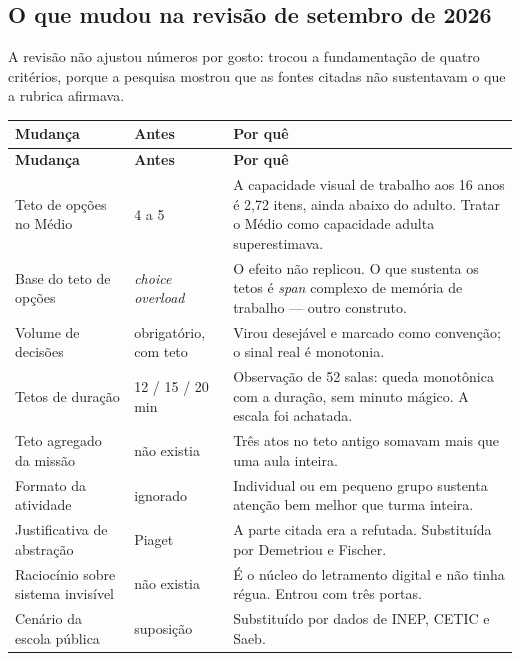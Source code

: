 \documentclass[11pt,a4paper]{article}
\begin{document}
\subsection{O que mudou na revisão de setembro de 2026}

A revisão não ajustou números por gosto: trocou a fundamentação de quatro critérios, porque a pesquisa mostrou que as fontes citadas não sustentavam o que a rubrica afirmava.

\begin{center}
\begin{longtable}{p{3.9cm}p{3.0cm}p{8.0cm}}
\toprule
\sffamily\bfseries\footnotesize\color{unNavy}Mudança & \sffamily\bfseries\footnotesize\color{unNavy}Antes & \sffamily\bfseries\footnotesize\color{unNavy}Por quê \\
\midrule
\endfirsthead
\toprule
\sffamily\bfseries\footnotesize\color{unNavy}Mudança & \sffamily\bfseries\footnotesize\color{unNavy}Antes & \sffamily\bfseries\footnotesize\color{unNavy}Por quê \\
\midrule
\endhead
Teto de opções no Médio & 4 a 5 & A capacidade visual de trabalho aos 16 anos é 2,72 itens, ainda abaixo do adulto. Tratar o Médio como capacidade adulta superestimava. \\
\addlinespace
Base do teto de opções & \emph{choice overload} & O efeito não replicou. O que sustenta os tetos é \emph{span} complexo de memória de trabalho --- outro construto. \\
\addlinespace
Volume de decisões & obrigatório, com teto & Virou desejável e marcado como convenção; o sinal real é monotonia. \\
\addlinespace
Tetos de duração & 12 / 15 / 20 min & Observação de 52 salas: queda monotônica com a duração, sem minuto mágico. A escala foi achatada. \\
\addlinespace
Teto agregado da missão & não existia & Três atos no teto antigo somavam mais que uma aula inteira. \\
\addlinespace
Formato da atividade & ignorado & Individual ou em pequeno grupo sustenta atenção bem melhor que turma inteira. \\
\addlinespace
Justificativa de abstração & Piaget & A parte citada era a refutada. Substituída por Demetriou e Fischer. \\
\addlinespace
Raciocínio sobre sistema invisível & não existia & É o núcleo do letramento digital e não tinha régua. Entrou com três portas. \\
\addlinespace
Cenário da escola pública & suposição & Substituído por dados de INEP, CETIC e Saeb. \\
\bottomrule
\end{longtable}
\end{center}
\end{document}

